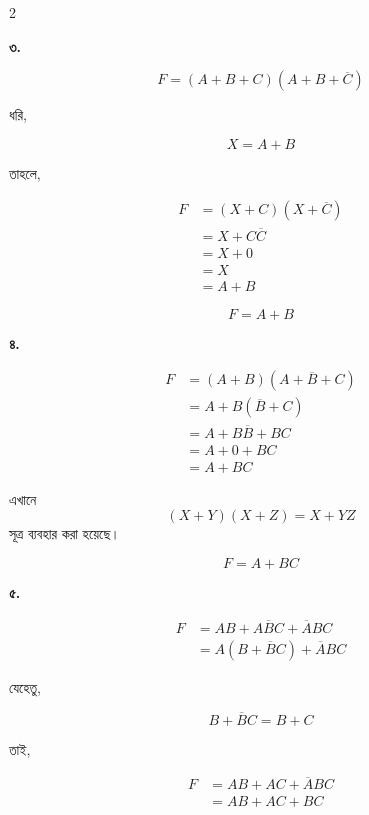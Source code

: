 \begin{multicols}{2}

\textbf{৩.}

\[
F=(A+B+C)(A+B+\overline C)
\]

ধরি,

\[
X=A+B
\]

তাহলে,

\[
\begin{aligned}
F
&=(X+C)(X+\overline C)\\
&=X+C\overline C\\
&=X+0\\
&=X\\
&=A+B
\end{aligned}
\]

\[
\boxed{F=A+B}
\]

\medskip


\textbf{৪.}

\[
\begin{aligned}
F
&=(A+B)(A+\overline B+C)\\
&=A+B(\overline B+C)\\
&=A+B\overline B+BC\\
&=A+0+BC\\
&=A+BC
\end{aligned}
\]

{\footnotesize
এখানে
\[
(X+Y)(X+Z)=X+YZ
\]
সূত্র ব্যবহার করা হয়েছে।
}

\[
\boxed{F=A+BC}
\]

\medskip


\textbf{৫.}

\[
\begin{aligned}
F
&=AB+A\overline BC+\overline ABC\\
&=A(B+\overline BC)+\overline ABC
\end{aligned}
\]

যেহেতু,

\[
B+\overline BC=B+C
\]

তাই,

\[
\begin{aligned}
F
&=AB+AC+\overline ABC\\
&=AB+AC+BC
\end{aligned}
\]


\end{multicols}
